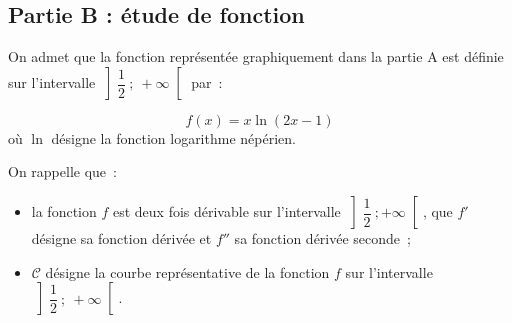 \documentclass[10pt]{article}
\begin{document}
\subsection*{Partie B : étude de fonction}

On admet que la fonction représentée graphiquement dans la partie A est définie sur l'intervalle $\left]\dfrac{1}{2}~;~+\infty\right[$ par~:

\[f(x) = x\ln(2x-1)\]
où $\ln$ désigne la fonction logarithme népérien.

On rappelle que~:
\begin{itemize}[noitemsep]
\item la fonction $f$ est deux fois dérivable sur l'intervalle $\left]\dfrac{1}{2}~;+\infty\right[$, que $f'$ désigne sa fonction dérivée et $f''$ sa fonction dérivée seconde~;
\item $\mathcal{C}$ désigne la courbe représentative de la fonction $f$ sur l'intervalle $\left]\dfrac{1}{2}~;~+\infty\right[$.
\end{itemize}
\end{document}
